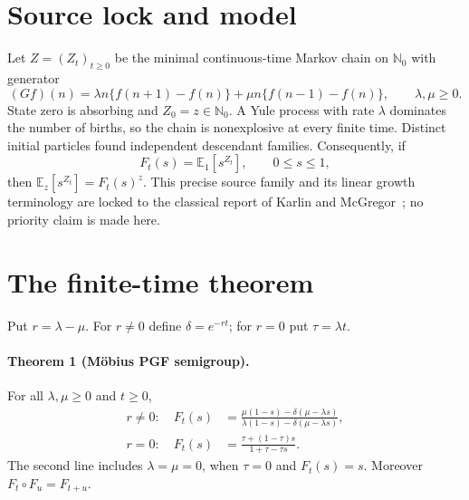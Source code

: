 \documentclass[9pt]{extarticle}
\newcommand{\Nzero}{\mathbb N_0}
\begin{document}
\section{Source lock and model}
Let $Z=(Z_t)_{t\geq0}$ be the minimal continuous-time Markov chain on
$\Nzero$ with generator
\begin{equation}\label{eq:generator}
 (Gf)(n)=\lambda n\{f(n+1)-f(n)\}
          +\mu n\{f(n-1)-f(n)\},
 \qquad \lambda,\mu\geq0.
\end{equation}
State zero is absorbing and $Z_0=z\in\Nzero$.  A Yule process with rate
$\lambda$ dominates the number of births, so the chain is nonexplosive at
every finite time.  Distinct initial particles found independent descendant
families.  Consequently, if
\[
 F_t(s)=\mathbb E_1[s^{Z_t}],\qquad 0\leq s\leq1,
\]
then $\mathbb E_z[s^{Z_t}]=F_t(s)^z$.  This precise source family and its
linear growth terminology are locked to the classical report of Karlin and
McGregor~\cite{KM58}; no priority claim is made here.

\section{The finite-time theorem}
Put $r=\lambda-\mu$.  For $r\ne0$ define
$\delta=e^{-rt}$; for $r=0$ put $\tau=\lambda t$.

\paragraph{Theorem 1 (M\"obius PGF semigroup).}
For all $\lambda,\mu\geq0$ and $t\geq0$,
\begin{align}
 r\ne0:\quad
 F_t(s)&=\frac{\mu(1-s)-\delta(\mu-\lambda s)}
 {\lambda(1-s)-\delta(\mu-\lambda s)}, \label{eq:offpgf}\\
 r=0:\quad
 F_t(s)&=\frac{\tau+(1-\tau)s}{1+\tau-\tau s}. \label{eq:critpgf}
\end{align}
The second line includes $\lambda=\mu=0$, when $\tau=0$ and $F_t(s)=s$.
Moreover $F_t\circ F_u=F_{t+u}$.
\end{document}
